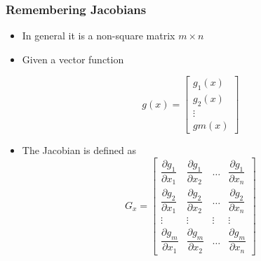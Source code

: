 \begin{frame}
    \frametitle{Remembering Jacobians}

    \begin{itemize}
        \item In general it is a non-square matrix $m \times n$
        \item Given a vector function

        \begin{equation*}
            g(x) =
            \begin{bmatrix}
                g_{1}(x) \\
                g_{2}(x) \\
                \vdots \\
                gm(x)
            \end{bmatrix}
        \end{equation*}

        \item The Jacobian is defined as
        \begin{equation*}
            G_x =
            \begin{bmatrix}
                \dfrac{\partial g_{1}}{\partial x_{1}} & \dfrac{\partial g_{1}}{\partial x_{2}}& \dots & \dfrac{\partial g_{1}}{\partial x_{n}}\\
                \dfrac{\partial g_{2}}{\partial x_{1}} & \dfrac{\partial g_{2}}{\partial x_{2}}& \dots & \dfrac{\partial g_{2}}{\partial x_{n}}\\
                \vdots & \vdots& \vdots & \vdots\\
                \dfrac{\partial g_{m}}{\partial x_{1}} & \dfrac{\partial g_{m}}{\partial x_{2}}& \dots & \dfrac{\partial g_{m}}{\partial x_{n}}
            \end{bmatrix}
        \end{equation*}
    \end{itemize}
\end{frame}

